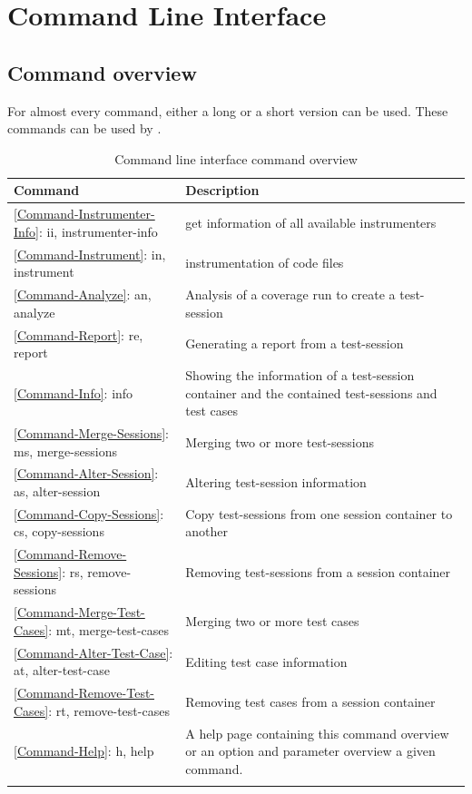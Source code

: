 \section{Command Line Interface}
\subsection{Command overview} \label{fr:Batch interface-Command overview}
For almost every command, either a long or a short version can be used. These commands can be used by .
\begin{longtable}{|l|p{6cm}|}\hline
   {\textbf{Command}} &
   {\textbf{Description}} \\\hline \hline \endhead
   \ref{Command-Instrumenter-Info}: {ii, instrumenter-info} & get information of all available instrumenters \\\hline
   \ref{Command-Instrument}: {in, instrument} & instrumentation of code files \\\hline
   \ref{Command-Analyze}: {an, analyze} & Analysis of a coverage run to create a test-session \\\hline
   \ref{Command-Report}: {re, report} & Generating a report from a test-session \\\hline
   \ref{Command-Info}: {info} & Showing the information of a test-session container and the contained test-sessions and test cases \\\hline
   \ref{Command-Merge-Sessions}: {ms, merge-sessions} & Merging two or more test-sessions \\\hline
   \ref{Command-Alter-Session}: {as, alter-session} & Altering test-session information \\\hline
   \ref{Command-Copy-Sessions}: {cs, copy-sessions} & Copy test-sessions from one session container to another \\\hline
   \ref{Command-Remove-Sessions}: {rs, remove-sessions} & Removing test-sessions from a session container \\\hline
   \ref{Command-Merge-Test-Cases}: {mt, merge-test-cases} & Merging two or more test cases \\\hline
   \ref{Command-Alter-Test-Case}: {at, alter-test-case} & Editing test case information \\\hline
   \ref{Command-Remove-Test-Cases}: {rt, remove-test-cases} & Removing test cases from a session container \\\hline
   \ref{Command-Help}: {h, help} & A help page containing this command overview or an option and parameter overview a given command. \\\hline

  \caption{Command line interface command overview}
  \label{CLI command overview}
\end{longtable}

